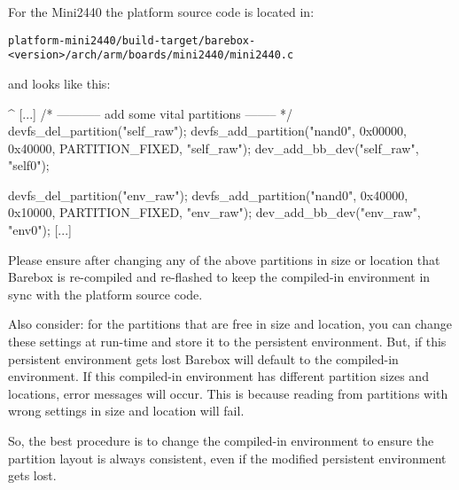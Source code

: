 For the Mini2440 the platform source code is located in:

\texttt{platform-mini2440/build-target/barebox-<version>/arch/arm/boards/mini2440/mini2440.c}

and looks like this:

\begin{ptxshell}[escapechar=|]{^}
[...]
      /* ----------- add some vital partitions -------- */
   devfs_del_partition("self_raw");
   devfs_add_partition("nand0", 0x00000, 0x40000, PARTITION_FIXED, "self_raw");
   dev_add_bb_dev("self_raw", "self0");

   devfs_del_partition("env_raw");
   devfs_add_partition("nand0", 0x40000, 0x10000, PARTITION_FIXED, "env_raw");
   dev_add_bb_dev("env_raw", "env0");
[...]
\end{ptxshell}

Please ensure after changing any of the above partitions in size or location
that Barebox is re-compiled and re-flashed to keep the compiled-in environment
in sync with the platform source code.

Also consider: for the partitions that are free in size and location, you can
change these settings at run-time and store it to the persistent environment.
But, if this persistent environment gets lost Barebox will default to the
compiled-in environment. If this compiled-in environment has different
partition sizes and locations, error messages will occur. This is because
reading from partitions with wrong settings in size and location will fail.

So, the best procedure is to change the compiled-in environment to ensure the
partition layout is always consistent, even if the modified persistent
environment gets lost.
